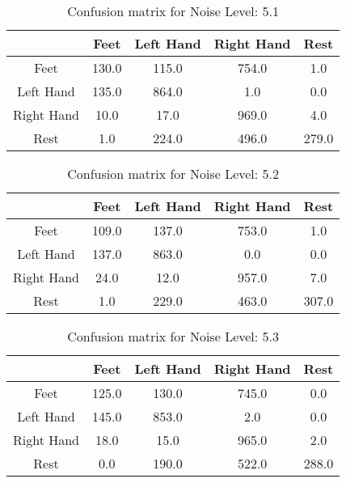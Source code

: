 \begin{table}[!htbp]
    \centering
    \begin{tabular}{|c||c|c|c|c|}
        \hline
		 & Feet & Left Hand & Right Hand & Rest \\
        \hline
        \hline
        Feet & 130.0 & 115.0 & 754.0 & 1.0 \\
        \hline
        Left Hand & 135.0 & 864.0 & 1.0 & 0.0 \\
        \hline
        Right Hand & 10.0 & 17.0 & 969.0 & 4.0 \\
        \hline
        Rest & 1.0 & 224.0 & 496.0 & 279.0 \\
        \hline
    \end{tabular}
    \caption{Confusion matrix for Noise Level: 5.1}
\end{table}

\begin{table}[!htbp]
    \centering
    \begin{tabular}{|c||c|c|c|c|}
        \hline
		 & Feet & Left Hand & Right Hand & Rest \\
        \hline
        \hline
        Feet & 109.0 & 137.0 & 753.0 & 1.0 \\
        \hline
        Left Hand & 137.0 & 863.0 & 0.0 & 0.0 \\
        \hline
        Right Hand & 24.0 & 12.0 & 957.0 & 7.0 \\
        \hline
        Rest & 1.0 & 229.0 & 463.0 & 307.0 \\
        \hline
    \end{tabular}
    \caption{Confusion matrix for Noise Level: 5.2}
\end{table}

\begin{table}[!htbp]
    \centering
    \begin{tabular}{|c||c|c|c|c|}
        \hline
		 & Feet & Left Hand & Right Hand & Rest \\
        \hline
        \hline
        Feet & 125.0 & 130.0 & 745.0 & 0.0 \\
        \hline
        Left Hand & 145.0 & 853.0 & 2.0 & 0.0 \\
        \hline
        Right Hand & 18.0 & 15.0 & 965.0 & 2.0 \\
        \hline
        Rest & 0.0 & 190.0 & 522.0 & 288.0 \\
        \hline
    \end{tabular}
    \caption{Confusion matrix for Noise Level: 5.3}
\end{table}

